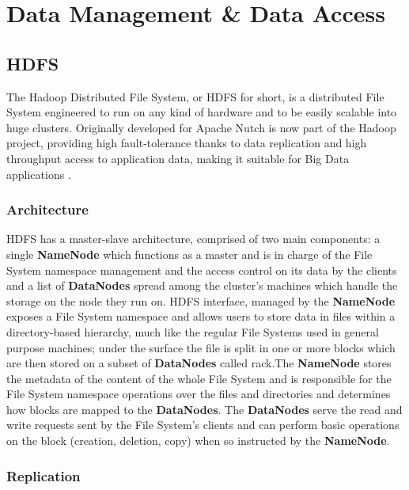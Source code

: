 \chapter{Data Management \& Data Access}

\section{HDFS}

The Hadoop Distributed File System, or HDFS for short, is a distributed File System engineered to run on any kind of hardware and to be easily scalable into huge clusters. Originally developed for Apache Nutch is now part of the Hadoop project, providing high fault-tolerance thanks to data replication and high throughput access to application data, making it suitable for Big Data applications \cite{hadoop_doc}.

\subsection{Architecture} 

HDFS has a master-slave architecture, comprised of two main components: a single \textbf{NameNode} which functions as a master and is in charge of the File System namespace management and the access control on its data by the clients and a list of \textbf{DataNodes} spread among the cluster's machines which handle the storage on the node they run on.\newline
HDFS interface, managed by the \textbf{NameNode} exposes a File System namespace and allows users to store data in files within a directory-based hierarchy, much like the regular File Systems used in general purpose machines; under the surface the file is split in one or more blocks which are then stored on a subset of \textbf{DataNodes} called rack.\newline The \textbf{NameNode} stores the metadata of the content of the whole File System and is responsible for the File System namespace operations over the files and directories and determines how blocks are mapped to the \textbf{DataNodes}.
The \textbf{DataNodes} serve the read and write requests sent by the File System's clients and can perform basic operations on the block (creation, deletion, copy) when so instructed by the \textbf{NameNode}.

\subsection{Replication} 

